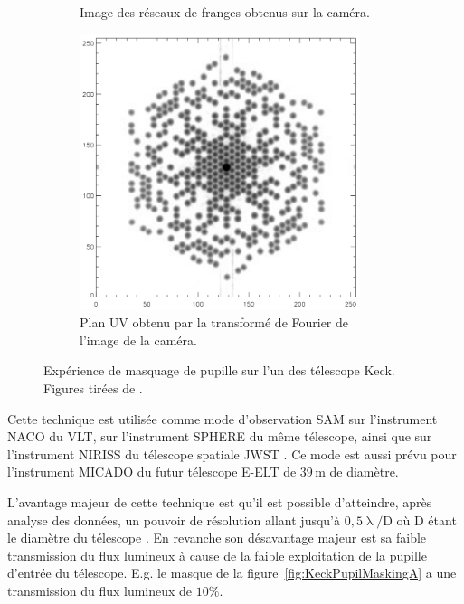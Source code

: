 \begin{figure}[ht!]
\begin{subfigure}[t]{0.3\textwidth}
        \caption{Image des réseaux de franges obtenus sur la caméra.}
        \label{fig:KeckPupilMaskingB}
    \end{subfigure}
    \begin{subfigure}[t]{0.3\textwidth}
        \centering
        \includegraphics[width=0.9\textwidth]{Figure_Chap1/Tuthill2000_Figure3c.png}
        \caption{Plan UV obtenu par la transformé de Fourier de l'image de la caméra.}
        \label{fig:KeckPupilMaskingC}
    \end{subfigure}
    \caption[Expérience de masquage de pupille sur l'un des télescope Keck.]{Expérience de masquage de pupille sur l'un des télescope Keck. Figures tirées de \cite{tuthill2000}.}
    \label{fig:KeckPupilMasking}
\end{figure}

Cette technique est utilisée comme mode d'observation \ac{SAM} sur l'instrument \ac{NACO} \citep{tuthill2010, lacour2011a} du \ac{VLT}, sur l'instrument \ac{SPHERE} \citep{cheetham2016} du même télescope, ainsi que sur l'instrument \ac{NIRISS} du télescope spatiale \ac{JWST} \citep{sivaramakrishnan2012}. Ce mode est aussi prévu pour l'instrument \ac{MICADO} \citep{lacour2014} du futur télescope \ac{E-ELT} de $39 \,$m de diamètre.

L'avantage majeur de cette technique est qu'il est possible d'atteindre, après analyse des données, un pouvoir de résolution allant jusqu'à $0,5 \uplambda / \text{D}$ où D étant le diamètre du télescope \citep{lacour2011b}. En revanche son désavantage majeur est sa faible transmission du flux lumineux à cause de la faible exploitation de la pupille d'entrée du télescope. E.g. le masque de la figure~\ref{fig:KeckPupilMaskingA} a une transmission du flux lumineux de $10\%$.

